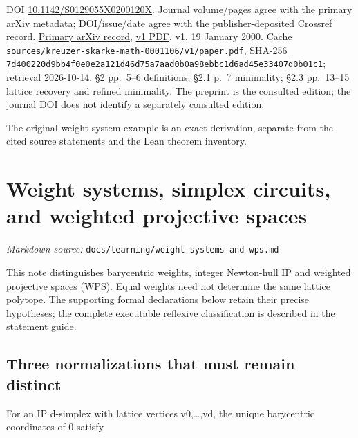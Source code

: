 \documentclass[11pt,a4paper,oneside]{report}
\begin{document}
\begin{itemize}
  DOI
  \href{https://doi.org/10.1142/S0129055X0200120X}{10.\allowbreak{}1142/\allowbreak{}S0129055\allowbreak{}X0200120\allowbreak{}X}.
  Journal volume/pages agree with the primary arXiv metadata;
  DOI/issue/date agree with the publisher-deposited Crossref record.
  \href{https://arxiv.org/abs/math/0001106}{Primary arXiv record},
  \href{https://arxiv.org/pdf/math/0001106v1}{v1 PDF}, v1, 19 January
  2000. Cache
  \texttt{sources/\allowbreak{}kreuzer-\allowbreak{}skarke-\allowbreak{}math-\allowbreak{}0001106/\allowbreak{}v1/\allowbreak{}paper.\allowbreak{}pdf},
  SHA-256
  \texttt{7d400220\allowbreak{}d9bb4f0e\allowbreak{}0e2a121d\allowbreak{}46d75a7a\allowbreak{}ad0b0a98\allowbreak{}ebbc1d6a\allowbreak{}d45e3340\allowbreak{}7d0b01c1};
  retrieval 2026-10-14. §2 pp.~5--6 definitions; §2.1 p.~7 minimality;
  §2.3 pp.~13--15 lattice recovery and refined minimality. The preprint
  is the consulted edition; the journal DOI does not identify a
  separately consulted edition.
\end{itemize}

The original weight-system example is an exact derivation, separate from
the cited source statements and the Lean theorem inventory.

\chapter{Weight systems, simplex circuits, and weighted projective
spaces}\label{weight-systems-and-wps--weight-systems-simplex-circuits-and-weighted-projective-spaces}

\noindent\textit{Markdown source: }\texttt{docs/\allowbreak{}learning\allowbreak{}/\allowbreak{}weight-\allowbreak{}systems-\allowbreak{}and-\allowbreak{}wps.\allowbreak{}md}

This note distinguishes barycentric weights, integer Newton-hull IP and
weighted projective spaces (WPS). Equal weights need not determine the
same lattice polytope. The supporting formal declarations below retain
their precise hypotheses; the complete executable reflexive
classification is described in \href{../../proofs/STATEMENTS.md}{the
statement guide}.

\section{Three normalizations that must remain
distinct}\label{weight-systems-and-wps--three-normalizations-that-must-remain-distinct}

For an IP d-simplex with lattice vertices v0,\ldots,vd, the unique
barycentric coordinates of 0 satisfy
\end{document}
